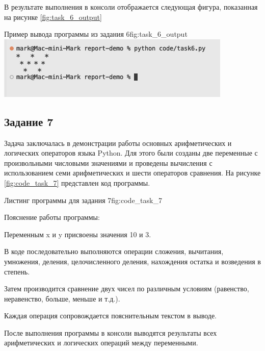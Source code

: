 \documentclass[]{vvsu}
\begin{document}
В результате выполнения в консоли отображается следующая фигура, показанная на рисунке \ref{fig:task_6_output}

\begin{vvsu_figure}{Пример вывода программы из задания 6}{fig:task_6_output}
  \includegraphics[width=0.65\linewidth]{task6-demo.png}
\end{vvsu_figure}

\subsection{Задание 7}

Задача заключалась в демонстрации работы основных арифметических и логических операторов языка Python.  
Для этого были созданы две переменные с произвольными числовыми значениями и проведены вычисления с использованием семи арифметических и шести операторов сравнения.  
На рисунке \ref{fig:code_task_7} представлен код программы.

\begin{vvsu_figure}{Листинг программы для задания 7}{fig:code_task_7}
  \begin{minipage}{.75\textwidth}
    
  \end{minipage}
\end{vvsu_figure}

Пояснение работы программы:
\begin{vvsu_list}
  \item Переменным x и y присвоены значения 10 и 3.
  \item В коде последовательно выполняются операции сложения, вычитания, умножения, деления, целочисленного деления, нахождения остатка и возведения в степень.
  \item Затем производится сравнение двух чисел по различным условиям (равенство, неравенство, больше, меньше и т.д.).
  \item Каждая операция сопровождается пояснительным текстом в выводе.
\end{vvsu_list}

После выполнения программы в консоли выводятся результаты всех арифметических и логических операций между переменными.
\end{document}
